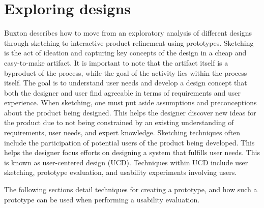 \section{Exploring designs} %
Buxton\cite{BUXTON2007135_skething,BUXTON2007139_prototyping} describes how to move from an exploratory analysis of different designs through sketching to interactive product refinement using prototypes. 
Sketching is the act of ideation and capturing key concepts of the design in a cheap and easy-to-make artifact. 
It is important to note that the artifact itself is a byproduct of the process, while the goal of the activity lies within the process itself.\cite{BUXTON2007135_skething}
The goal is to understand user needs and develop a design concept that both the designer and user find agreeable in terms of requirements and user experience. 
When sketching, one must put aside assumptions and preconceptions about the product being designed.
This helps the designer discover new ideas for the product due to not being constrained by an existing understanding of requirements, user needs, and expert knowledge.
Sketching techniques often include the participation of potential users of the product being developed.
This helps the designer focus efforts on designing a system that fulfills user needs.
This is known as user-centered design (UCD). \cite{user-centred-design}
Techniques within UCD include user sketching, prototype evaluation, and usability experiments involving users.

The following sections detail techniques for creating a prototype, and how such a prototype can be used when performing a usability evaluation.